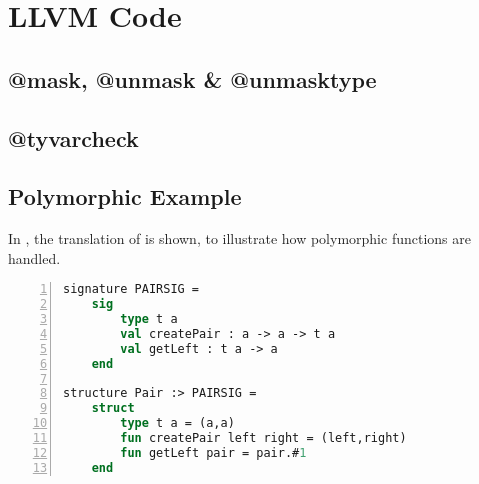 \chapter{LLVM Code}
\label{App:LLVMCode}
\section{@mask, @unmask \& @unmasktype}

\section{@tyvarcheck}

\section{Polymorphic Example}
\label{sec:PolymorphicExample}

In , the \LLVMIR translation of  is shown, to illustrate how polymorphic functions are handled.

\begin{lstlisting}[frame=single, language=ML,numbers=left, label=ml:polymorphic, caption={[Pair structure MiniML]The polymorphic Pair structure.}]
signature PAIRSIG =
    sig 
        type t a
        val createPair : a -> a -> t a
        val getLeft : t a -> a
    end

structure Pair :> PAIRSIG =
    struct
        type t a = (a,a)
        fun createPair left right = (left,right)
        fun getLeft pair = pair.#1
    end
\end{lstlisting}


